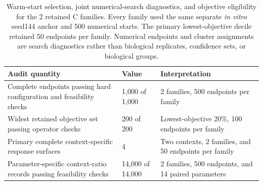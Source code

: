 \begin{table}[!htbp]
\centering
\scriptsize
\setlength{\tabcolsep}{2.5pt}
\caption{Warm-start selection, joint numerical-search diagnostics, and objective eligibility for the 2 retained C families. Every family used the same separate \textit{in vitro} seed144 anchor and 500 numerical starts. The primary lowest-objective decile retained 50 endpoints per family. Numerical endpoints and cluster assignments are search diagnostics rather than biological replicates, confidence sets, or biological groups.}
\label{tab:joint_search_summary}
\vspace{0.7em}
\begin{tabular}{@{}p{}p{}p{}@{}}
\toprule
Audit quantity & Value & Interpretation \\
\midrule
Complete endpoints passing hard configuration and feasibility checks & 1,000 of 1,000 & 2 families, 500 endpoints per family \\
Widest retained objective set passing operator checks & 200 of 200 & Lowest-objective 20\%, 100 endpoints per family \\
Primary complete context-specific response surfaces & 4 & Two contexts, 2 families, and 50 endpoints per family \\
Parameter-specific context-ratio records passing feasibility checks & 14,000 of 14,000 & 2 families, 500 endpoints, and 14 paired parameters \\

\end{tabular}
\end{table}
